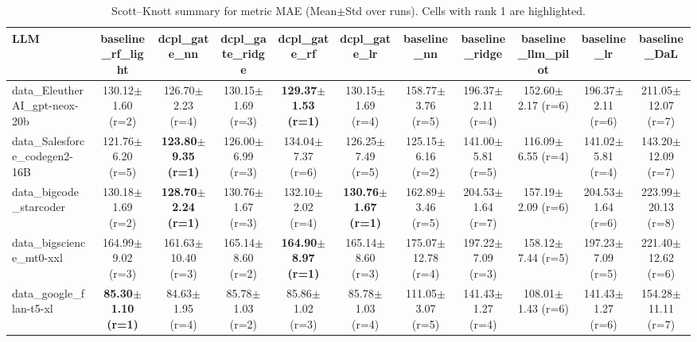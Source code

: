 \begin{table}[t]
\centering
\small
\caption{Scott--Knott summary for metric MAE (Mean$\pm$Std over runs). Cells with rank 1 are highlighted.}
\label{tab:sk_mae}
\setlength{\tabcolsep}{4pt}
\renewcommand{\arraystretch}{1.15}
\begin{tabular}{lcccccccccc}
\toprule
LLM & baseline\_rf\_light & dcpl\_gate\_nn & dcpl\_gate\_ridge & dcpl\_gate\_rf & dcpl\_gate\_lr & baseline\_nn & baseline\_ridge & baseline\_llm\_pilot & baseline\_lr & baseline\_DaL \\
\midrule
data\_EleutherAI\_gpt-neox-20b & 130.12$\pm$1.60 {\scriptsize (r=2)} & 126.70$\pm$2.23 {\scriptsize (r=4)} & 130.15$\pm$1.69 {\scriptsize (r=3)} & \cellcolor{red!15}\textbf{129.37$\pm$1.53 {\scriptsize (r=1)}} & 130.15$\pm$1.69 {\scriptsize (r=4)} & 158.77$\pm$3.76 {\scriptsize (r=5)} & 196.37$\pm$2.11 {\scriptsize (r=4)} & 152.60$\pm$2.17 {\scriptsize (r=6)} & 196.37$\pm$2.11 {\scriptsize (r=6)} & 211.05$\pm$12.07 {\scriptsize (r=7)} \\
data\_Salesforce\_codegen2-16B & 121.76$\pm$6.20 {\scriptsize (r=5)} & \cellcolor{red!15}\textbf{123.80$\pm$9.35 {\scriptsize (r=1)}} & 126.00$\pm$6.99 {\scriptsize (r=3)} & 134.04$\pm$7.37 {\scriptsize (r=6)} & 126.25$\pm$7.49 {\scriptsize (r=5)} & 125.15$\pm$6.16 {\scriptsize (r=2)} & 141.00$\pm$5.81 {\scriptsize (r=5)} & 116.09$\pm$6.55 {\scriptsize (r=4)} & 141.02$\pm$5.81 {\scriptsize (r=4)} & 143.20$\pm$12.09 {\scriptsize (r=7)} \\
data\_bigcode\_starcoder & 130.18$\pm$1.69 {\scriptsize (r=2)} & \cellcolor{red!15}\textbf{128.70$\pm$2.24 {\scriptsize (r=1)}} & 130.76$\pm$1.67 {\scriptsize (r=3)} & 132.10$\pm$2.02 {\scriptsize (r=4)} & \cellcolor{red!15}\textbf{130.76$\pm$1.67 {\scriptsize (r=1)}} & 162.89$\pm$3.46 {\scriptsize (r=5)} & 204.53$\pm$1.64 {\scriptsize (r=7)} & 157.19$\pm$2.09 {\scriptsize (r=6)} & 204.53$\pm$1.64 {\scriptsize (r=6)} & 223.99$\pm$20.13 {\scriptsize (r=8)} \\
data\_bigscience\_mt0-xxl & 164.99$\pm$9.02 {\scriptsize (r=3)} & 161.63$\pm$10.40 {\scriptsize (r=3)} & 165.14$\pm$8.60 {\scriptsize (r=2)} & \cellcolor{red!15}\textbf{164.90$\pm$8.97 {\scriptsize (r=1)}} & 165.14$\pm$8.60 {\scriptsize (r=3)} & 175.07$\pm$12.78 {\scriptsize (r=4)} & 197.22$\pm$7.09 {\scriptsize (r=3)} & 158.12$\pm$7.44 {\scriptsize (r=5)} & 197.23$\pm$7.09 {\scriptsize (r=5)} & 221.40$\pm$12.62 {\scriptsize (r=6)} \\
data\_google\_flan-t5-xl & \cellcolor{red!15}\textbf{85.30$\pm$1.10 {\scriptsize (r=1)}} & 84.63$\pm$1.95 {\scriptsize (r=4)} & 85.78$\pm$1.03 {\scriptsize (r=2)} & 85.86$\pm$1.02 {\scriptsize (r=3)} & 85.78$\pm$1.03 {\scriptsize (r=4)} & 111.05$\pm$3.07 {\scriptsize (r=5)} & 141.43$\pm$1.27 {\scriptsize (r=4)} & 108.01$\pm$1.43 {\scriptsize (r=6)} & 141.43$\pm$1.27 {\scriptsize (r=6)} & 154.28$\pm$11.11 {\scriptsize (r=7)} \\

\end{tabular}
\end{table}
